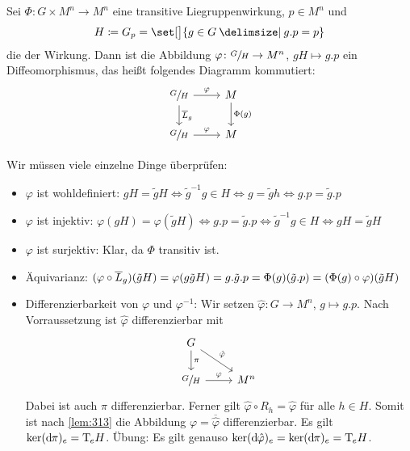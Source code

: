 \begin{lemma}[label=lem:316,{name=[$G$-äquivarianter Diffeo mit Standgruppe]}]
	Sei $\Phi \colon G \times M^n \to M^n$ eine transitive Liegruppenwirkung, $p \in M^n$ und 
	\[
		H \coloneqq G_p = \set[\big]{g \in G \given g.p=p}
	\]
	die  der Wirkung. 
	Dann ist die Abbildung $\varphi \colon \sfrac{G}{H} \to M^n$, $gH \mapsto g.p$ ein  Diffeomorphismus, das heißt folgendes Diagramm kommutiert:
	\[
		\begin{tikzcd}
			\sfrac{G}{H} \dar["\overline{L}_g"] \rar["\varphi"] & M \dar["\Phi(g)"] \\
			\sfrac{G}{H} \rar["\varphi"] & M
		\end{tikzcd}
	\]
\end{lemma}
\begin{beweis}
	Wir müssen viele einzelne Dinge überprüfen:
	\begin{itemize}[itemsep=1pt]
		\item $\varphi$ ist wohldefiniert: $gH = \tilde{g}H \iff \tilde{g}^{-1}g \in H \iff g = \tilde{g}h \iff g.p = \tilde{g}.p$
		\item $\varphi$ ist injektiv: $\varphi(gH) = \varphi(\tilde{g}H) \iff g.p = \tilde{g}.p \iff \tilde{g}^{-1}g \in H \iff gH = \tilde{g}H$
		\item $\varphi$ ist surjektiv: Klar, da $\Phi$ transitiv ist.
		\item Äquivarianz: 
		\(
			(\varphi \circ \overline{L}_g)(\tilde{g}H) = \varphi \enbrace*{g \tilde{g}H} = g.\tilde{g}.p = \Phi(g) \enbrace*{\tilde{g}.p} = \enbrace*{\Phi(g) \circ \varphi}(\tilde{g}H)
		\)
		\item Differenzierbarkeit von $\varphi$ und $\varphi^{-1}$:
		Wir setzen $\hat{\varphi} \colon G \to M^n$, $g \mapsto g.p$.
		Nach Vorraussetzung ist $\hat{\varphi}$ differenzierbar mit 
		\[
			\begin{tikzcd}
				G \drar["\hat{\varphi}"] \dar["\pi"] & \\
				\sfrac{G}{H} \rar["\varphi"] & M^n
			\end{tikzcd}
		\]
		Dabei ist auch $\pi$ differenzierbar.
		Ferner gilt $\hat{\varphi} \circ R_h = \hat{\varphi}$ für alle $h \in H$.
		Somit ist nach \autoref{lem:313} die Abbildung $\varphi = \overline{\hat{\varphi}}$ differenzierbar.
		Es gilt $\ker (\mathrm{d}\mkern-1.0mu \pi)_e = \mathrm{T}\mkern-0.85mu_e H$.
		Übung: Es gilt genauso $\ker (\mathrm{d}\mkern-1.0mu \hat{\varphi})_e = \ker (\mathrm{d}\mkern-1.0mu \pi)_e = \mathrm{T}\mkern-0.85mu_e H$.
		

\end{itemize}
\end{beweis}
